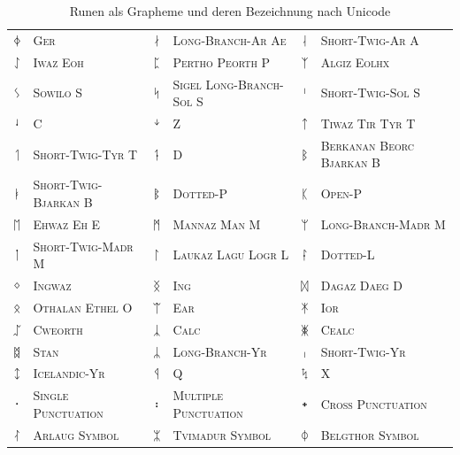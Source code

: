 \documentclass[a4paper]{scrartcl}
\begin{document}
\begin{table}[p]
\begin{center}
\begin{tabular}{clclcl}
      {\runicfont ᛄ} & \textsc{Ger} &
      {\runicfont ᛅ} & \textsc{Long-Branch-Ar Ae} &
      {\runicfont ᛆ} & \textsc{Short-Twig-Ar A} \\
      {\runicfont ᛇ} & \textsc{Iwaz Eoh} &
      {\runicfont ᛈ} & \textsc{Pertho Peorth P} &
      {\runicfont ᛉ} & \textsc{Algiz Eolhx} \\
      {\runicfont ᛊ} & \textsc{Sowilo S} &
      {\runicfont ᛋ} & \textsc{Sigel Long-Branch-Sol S} &
      {\runicfont ᛌ} & \textsc{Short-Twig-Sol S} \\
      {\runicfont ᛍ} & \textsc{C} &
      {\runicfont ᛎ} & \textsc{Z} &
      {\runicfont ᛏ} & \textsc{Tiwaz Tir Tyr T} \\
      {\runicfont ᛐ} & \textsc{Short-Twig-Tyr T} &
      {\runicfont ᛑ} & \textsc{D} &
      {\runicfont ᛒ} & \textsc{Berkanan Beorc Bjarkan B} \\
      {\runicfont ᛓ} & \textsc{Short-Twig-Bjarkan B} &
      {\runicfont ᛔ} & \textsc{Dotted-P} &
      {\runicfont ᛕ} & \textsc{Open-P} \\
      {\runicfont ᛖ} & \textsc{Ehwaz Eh E} &
      {\runicfont ᛗ} & \textsc{Mannaz Man M} &
      {\runicfont ᛘ} & \textsc{Long-Branch-Madr M} \\
      {\runicfont ᛙ} & \textsc{Short-Twig-Madr M} &
      {\runicfont ᛚ} & \textsc{Laukaz Lagu Logr L} &
      {\runicfont ᛛ} & \textsc{Dotted-L} \\
      {\runicfont ᛜ} & \textsc{Ingwaz} &
      {\runicfont ᛝ} & \textsc{Ing} &
      {\runicfont ᛞ} & \textsc{Dagaz Daeg D} \\
      {\runicfont ᛟ} & \textsc{Othalan Ethel O} &
      {\runicfont ᛠ} & \textsc{Ear} &
      {\runicfont ᛡ} & \textsc{Ior} \\
      {\runicfont ᛢ} & \textsc{Cweorth} &
      {\runicfont ᛣ} & \textsc{Calc} &
      {\runicfont ᛤ} & \textsc{Cealc} \\
      {\runicfont ᛥ} & \textsc{Stan} &
      {\runicfont ᛦ} & \textsc{Long-Branch-Yr} &
      {\runicfont ᛧ} & \textsc{Short-Twig-Yr} \\
      {\runicfont ᛨ} & \textsc{Icelandic-Yr} &
      {\runicfont ᛩ} & \textsc{Q} &
      {\runicfont ᛪ} & \textsc{X} \\
      {\runicfont ᛫} & \textsc{Single Punctuation} &
      {\runicfont ᛬} & \textsc{Multiple Punctuation} &
      {\runicfont ᛭} & \textsc{Cross Punctuation} \\
      {\runicfont ᛮ} & \textsc{Arlaug Symbol} &
      {\runicfont ᛯ} & \textsc{Tvimadur Symbol} &
      {\runicfont ᛰ} & \textsc{Belgthor Symbol}
    \end{tabular}
    \caption{Runen als Grapheme und deren Bezeichnung nach Unicode}
  \end{center}
\end{table}
\end{document}
